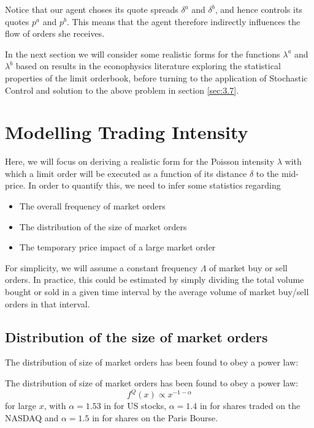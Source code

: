 Notice that our agent choses its quote spreads $\delta^a$ and $\delta^b$,
and hence controls its quotes $p^a$ and $p^b$. This means that the 
agent therefore indirectly influences the flow of orders she receives.

In the next section we will consider some realistic forms for the functions
$\lambda^a$ and $\lambda^b$ based on results in the econophysics literature
exploring the statistical properties of the limit orderbook, before 
turning to the application of Stochastic Control and solution to the 
above problem in section \ref{sec:3.7}.

\section{Modelling Trading Intensity}\label{sec:3.6}

Here, we will focus on deriving a realistic form for the Poisson intensity
$\lambda$ with which a limit order will be executed as a function of its
distance $\delta$ to the mid-price. In order to quantify this, we need 
to infer some statistics regarding
\begin{itemize}
    \item The overall frequency of market orders
    \item The distribution of the size of market orders
    \item The temporary price impact of a large market order
\end{itemize}
For simplicity, we will assume a constant frequency $\Lambda$ of market
buy or sell orders. In practice, this could be estimated by simply 
dividing the total volume bought or sold in a given time interval 
by the average volume of market buy/sell orders in that interval. 

\subsection*{Distribution of the size of market orders}

The distribution of size of market orders has been found to obey a 
power law:
\begin{theorem}
    The distribution of size of market orders has been found to obey a 
    power law:
    \begin{equation}\label{eq:3.13}
        f^{Q}(x)\propto x^{-1-\alpha}
    \end{equation}
    for large $x$, with $\alpha=1.53$ in \textcite{Gopi2000} for US stocks,
    $\alpha=1.4$ in \textcite{Maslov2001} for shares traded on the NASDAQ
    and $\alpha=1.5$ in \textcite{Gabaix2006} for shares on the Paris Bourse.
\end{theorem}

